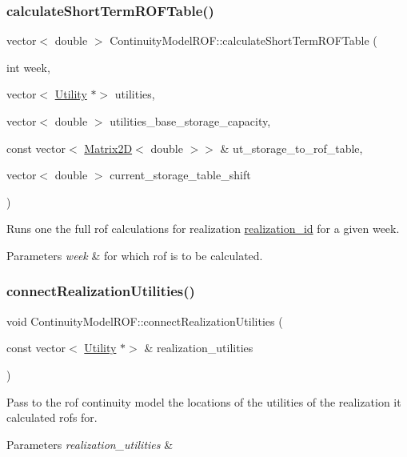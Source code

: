 \subsubsection{\texorpdfstring{calculate\+Short\+Term\+R\+O\+F\+Table()}{calculateShortTermROFTable()}}
{\footnotesize\ttfamily vector$<$ double $>$ Continuity\+Model\+R\+O\+F\+::calculate\+Short\+Term\+R\+O\+F\+Table (\begin{DoxyParamCaption}\item[{int}]{week,  }\item[{vector$<$ \mbox{\hyperlink{classUtility}{Utility}} $\ast$$>$}]{utilities,  }\item[{vector$<$ double $>$}]{utilities\+\_\+base\+\_\+storage\+\_\+capacity,  }\item[{const vector$<$ \mbox{\hyperlink{classMatrix2D}{Matrix2D}}$<$ double $>$$>$ \&}]{ut\+\_\+storage\+\_\+to\+\_\+rof\+\_\+table,  }\item[{vector$<$ double $>$}]{current\+\_\+storage\+\_\+table\+\_\+shift }\end{DoxyParamCaption})}

Runs one the full rof calculations for realization \mbox{\hyperlink{classContinuityModel_a7b6c99bf256f6c6b633ebb78282f43c7}{realization\+\_\+id}} for a given week. 
\begin{DoxyParams}{Parameters}
{\em week} & for which rof is to be calculated. \\
\hline
\end{DoxyParams}
\mbox{\label{classContinuityModelROF_abc16c650a854b60dfc42ab2d32ef4b0c}} 
\subsubsection{\texorpdfstring{connect\+Realization\+Utilities()}{connectRealizationUtilities()}}
{\footnotesize\ttfamily void Continuity\+Model\+R\+O\+F\+::connect\+Realization\+Utilities (\begin{DoxyParamCaption}\item[{const vector$<$ \mbox{\hyperlink{classUtility}{Utility}} $\ast$$>$ \&}]{realization\+\_\+utilities }\end{DoxyParamCaption})}

Pass to the rof continuity model the locations of the utilities of the realization it calculated rofs for. 
\begin{DoxyParams}{Parameters}
{\em realization\+\_\+utilities} & \\
\hline
\end{DoxyParams}
\mbox{\label{classContinuityModelROF_a0c12b5dad97c3783361baad7e53a2634}} 
